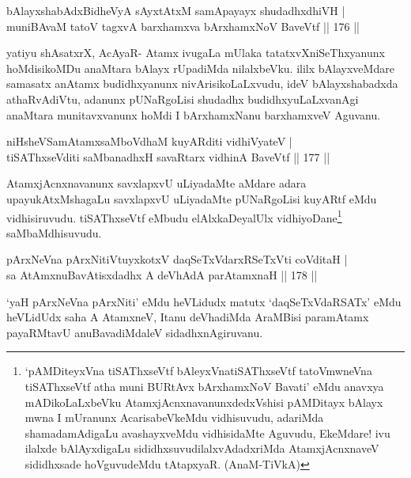 \begin{shl}
bAlayxshabAdxBidheVyA sAyxtAtxM samApayayx shudadhxdhiVH |\\
muniBAvaM tatoV tagxvA barxhamxva bArxhamxNoV BaveVtf \hfill || 176 ||
\end{shl}

\begin{artha}
yatiyu shAsatxrX, AcAyaR- Atamx ivugaLa mUlaka tatatxvXniSeThxyanunx hoMdisikoMDu anaMtara bAlayx rUpadiMda nilalxbeVku. ililx bAlayxveMdare samasatx anAtamx budidhxyanunx nivArisikoLaLxvudu, ideV bAlayxshabadxda athaRvAdiVtu, adanunx pUNaRgoLisi shudadhx budidhxyuLaLxvanAgi anaMtara munitavxvanunx hoMdi I bArxhamxNanu barxhamxveV Aguvanu.
\end{artha}

\begin{shl}
niHsheVSamAtamxsaMboVdhaM kuyARditi vidhiVyateV |\\
tiSAThxseVditi saMbanadhxH savaRtarx vidhinA BaveVtf \hfill || 177 ||
\end{shl}

\begin{artha}
AtamxjAcnxnavanunx savxlapxvU uLiyadaMte aMdare adara upayukAtxMshagaLu savxlapxvU uLiyadaMte pUNaRgoLisi kuyARtf eMdu vidhisiruvudu. tiSAThxseVtf eMbudu elAlxkaDeyalUlx vidhiyoDane\footnote{`pAMDiteyxVna tiSAThxseVtf bAleyxVnatiSAThxseVtf tatoVmwneVna tiSAThxseVtf atha muni BURtAvx bArxhamxNoV Bavati' eMdu anavxya mADikoLaLxbeVku AtamxjAcnxnavanunxdedxVshisi pAMDitayx bAlayx mwna I mUranunx AcarisabeVkeMdu vidhisuvudu, adariMda shamadamAdigaLu avashayxveMdu vidhisidaMte Aguvudu, EkeMdare! ivu ilalxde bAlAyxdigaLu sididhxsuvudilalxvAdadxriMda AtamxjAcnxnaveV sididhxsade hoVguvudeMdu tAtapxyaR. (AnaM-TiVkA)} saMbaMdhisuvudu.
\end{artha}


\begin{shl}
pArxNeVna pArxNitiVtuyxkotxV daqSeTxVdarxRSeTxVti coVditaH |\\
sa AtAmx\s nuBavAtisxdadhx A deVhAdA parAtamxnaH \hfill || 178 ||
\end{shl}

\begin{artha}
`yaH pArxNeVna pArxNiti' eMdu heVLidudx matutx `daqSeTxVdaRSATx' eMdu heVLidUdx saha A AtamxneV, Itanu deVhadiMda AraMBisi paramAtamx payaRMtavU anuBavadiMdaleV sidadhxnAgiruvanu.
\end{artha}

